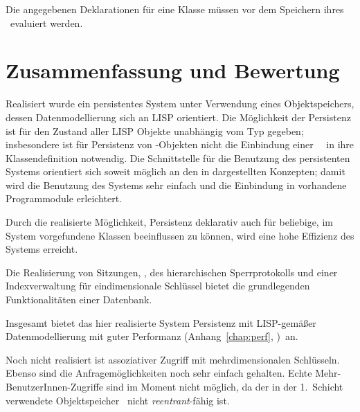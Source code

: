 Die angegebenen Deklarationen f\"{u}r eine Klasse m\"{u}ssen vor dem
Speichern ihres \clsdo[es]\ evaluiert werden.
\iffalse
Weiter Beispiele von
Deklarationen f\"{u}r systeminterne \lw\ Klassen befinden sich im Modul
\lisp{lisp-works}; das Modul \lisp{plob-obvius}\ enth\"{a}lt
Deklarationen, die es erm\"{o}glichen, Objekte des bildverarbeitenden
Systems {\sc Obvius} persistent zu halten.
\fi
%
\ifbericht%
\def\nextstep{\relax}%
\else%
\def\nextstep{%
\let\pfsection\section%
\let\pfsubsection\subsection%
\let\pfsubsubsection\subsubsection%
}%
\fi%
\nextstep%
%
\section{Zusammenfassung und Bewertung}%
\label{sec:plsac}%
%
Realisiert wurde ein persistentes System unter Verwendung eines
Objektspeichers, dessen Datenmodellierung sich an LISP orientiert.
Die M\"{o}glichkeit der Persistenz ist f\"{u}r den Zustand aller LISP
Objekte un\-ab\-h\"{a}n\-gig vom Typ gegeben; insbesondere ist f\"{u}r
Persistenz von \clos-Objekten nicht die Einbindung einer
\spc[n]\ \clsmc\ in ihre Klassendefinition notwendig. Die
Schnittstelle f\"{u}r die Benutzung des persistenten Systems orientiert
sich soweit m\"{o}glich an den in \cite{bib:st90} dargestellten
Konzepten; damit wird die Benutzung des Systems sehr einfach und die
Einbindung in vorhandene Programmodule erleichtert.
%
\par{}Durch die realisierte M\"{o}glichkeit, Persistenz deklarativ auch
f\"{u}r beliebige, im System vorgefundene Klassen beeinflussen zu
k\"{o}nnen, wird eine hohe Effizienz des Systems erreicht.
%
\par{}Die Realisierung von Sitzungen, \twophasetrs,
des hierarchischen Sperrprotokolls und einer Indexverwaltung f\"{u}r
eindimensionale Schl\"{u}ssel bietet die grundlegenden
Funktionalit\"{a}ten einer Datenbank.
%
\par{}Insgesamt bietet das hier realisierte System Persistenz mit
LISP-gem\"{a}\ss{}er Datenmodellierung mit guter Performanz
\ifbericht(Anhang~\ref{chap:perf},
\citepage{\pageref{chap:perf}})\fi\ an.
%
\par{}Noch nicht realisiert ist assoziativer Zugriff mit
mehrdimensionalen Schl\"{u}sseln. Ebenso sind die Anfragem\"{o}glichkeiten
noch sehr einfach gehalten. Echte Mehr-BenutzerInnen-Zugriffe sind
im Moment nicht m\"{o}glich, da der in der 1.~Schicht verwendete
Objektspeicher \postore\ nicht {\em reentrant\/}-f\"{a}hig ist.


